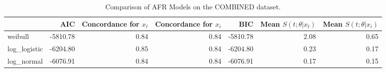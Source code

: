 \begin{table}
\caption{Comparison of AFR Models on the COMBINED dataset.}
\label{tab:Combined}
\begin{tabular}{lrrrrrr}
\toprule
 & AIC & Concordance for $x_t$ & Concordance for $x_i$ & BIC & Mean $S(t;\theta|x_{t})$ & Mean $S(t;\theta|x_{i})$ \\
\midrule
weibull & -5810.78 & 0.84 & 0.84 & -5810.78 & 2.08 & 0.65 \\
log_logistic & -6204.80 & 0.85 & 0.84 & -6204.80 & 0.23 & 0.17 \\
log_normal & -6076.91 & 0.84 & 0.84 & -6076.91 & 0.17 & 0.15 \\
\bottomrule
\end{tabular}
\end{table}
